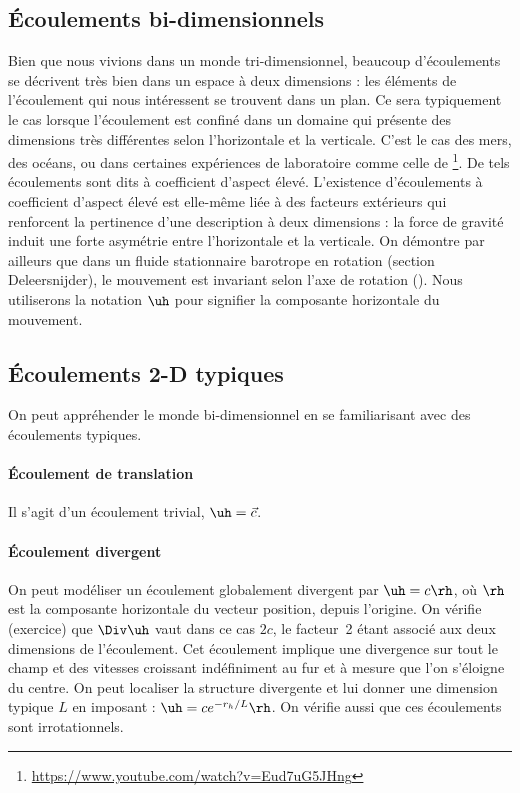 \subsection{Écoulements bi-dimensionnels}
Bien que nous vivions dans un monde tri-dimensionnel, beaucoup d'écoulements se décrivent très bien dans un espace à deux dimensions : les éléments de l'écoulement qui nous intéressent se trouvent dans un plan.
Ce sera typiquement le cas lorsque l'écoulement est confiné dans un domaine qui présente des dimensions très différentes selon l'horizontale et la verticale. C'est le cas des mers, des océans, ou dans certaines expériences de laboratoire comme celle de \footnote{\url{https://www.youtube.com/watch?v=Eud7uG5JHng}}. De tels écoulements sont dits à coefficient d'aspect élevé.
L'existence d'écoulements à coefficient d'aspect élevé est elle-même liée à des facteurs extérieurs qui renforcent la pertinence d'une description à deux dimensions : la force de gravité induit une forte asymétrie entre l'horizontale et la verticale. On démontre par ailleurs que dans un fluide stationnaire barotrope en rotation (section Deleersnijder), le mouvement est invariant selon l'axe de rotation ().
Nous utiliserons la notation $\uh$ pour signifier la composante horizontale du mouvement.

\subsection{Écoulements 2-D typiques}
On peut appréhender le monde bi-dimensionnel en se familiarisant avec des écoulements typiques.

\paragraph{Écoulement de translation}
Il s'agit d'un écoulement trivial, $\uh=\vec{c}$.

\paragraph{Écoulement divergent}
On peut modéliser un écoulement globalement divergent par $\uh=c\rh$, où $\rh$ est la composante horizontale du vecteur position, depuis l'origine.
On vérifie (exercice) que $\Div\uh$ vaut dans ce cas $2c$, le facteur~2 étant associé aux deux dimensions de l'écoulement. Cet écoulement implique une divergence sur tout le champ et des vitesses croissant indéfiniment au fur et à mesure que l'on s'éloigne du centre. On peut localiser la structure divergente et lui donner une dimension typique $L$ en imposant : $\uh=ce^{-r_h/L}\rh$. On vérifie aussi que ces écoulements sont irrotationnels.

